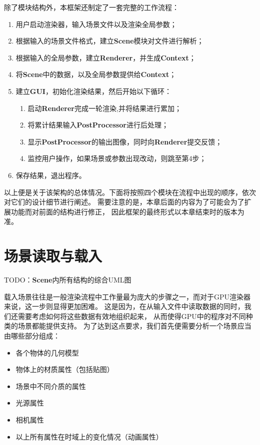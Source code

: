 除了模块结构外，本框架还制定了一套完整的工作流程：

\begin{enumerate}
    \item{用户启动渲染器，输入场景文件以及渲染全局参数；}
    \item{根据输入的场景文件格式，建立\textbf{\textbf{Scene}}模块对文件进行解析；}
    \item{根据输入的全局参数，建立\textbf{Renderer}，并生成\textbf{Context}；}
    \item{将\textbf{\textbf{Scene}}中的数据，以及全局参数提供给\textbf{Context}；}
    \item{建立\textbf{GUI}，初始化渲染结果，然后开始以下循环：}
    \begin{enumerate}
        \item{启动\textbf{Renderer}完成一轮渲染,并将结果进行累加；}
        \item{将累计结果输入\textbf{PostProcessor}进行后处理；}
        \item{显示\textbf{PostProcessor}的输出图像，同时向\textbf{Renderer}提交反馈；}
        \item{监控用户操作，如果场景或参数出现改动，则跳至第4步；}
    \end{enumerate}
    \item{保存结果，退出程序。}
\end{enumerate}

以上便是关于该架构的总体情况。下面将按照四个模块在流程中出现的顺序，依次对它们的设计细节进行阐述。
需要注意的是，本章后面的内容为了可能会为了扩展功能而对前面的结构进行修正，
因此框架的最终形式以本章结束时的版本为准。

\section{场景读取与载入}

TODO：\textbf{Scene}内所有结构的综合UML图

载入场景往往是一般渲染流程中工作量最为庞大的步骤之一，而对于GPU渲染器来说，这一步则显得更加困难。
这是因为，在从输入文件中读取数据的同时，我们还需要考虑如何将这些数据有效地组织起来，
从而使得GPU中的程序对不同种类的场景都能提供支持。
为了达到这点要求，我们首先便需要分析一个场景应当由哪些部分组成：

\label{PropertyList}
\begin{itemize}
\item{各个物体的几何模型}
\item{物体上的材质属性（包括贴图）} 
\item{场景中不同介质的属性} 
\item{光源属性}
\item{相机属性}
\item{以上所有属性在时域上的变化情况（动画属性）}  
\end{itemize}

